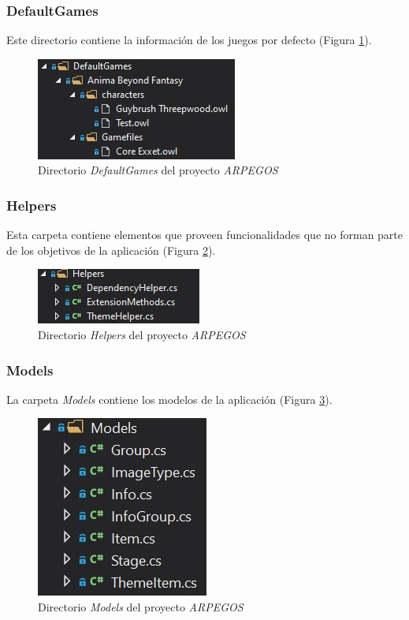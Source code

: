 {\subsubsection{DefaultGames}
Este directorio contiene la información de los juegos por defecto (Figura \ref*{DefaultGames}).

\begin{figure}[H]
    \centering
    \includegraphics[scale=1.5]{Images/ARPEGOS_DefaultGames.jpg}
    \caption{Directorio \textit{DefaultGames} del proyecto \textit{ARPEGOS}}
    \label{DefaultGames}    
\end{figure}

\subsubsection{Helpers}
Esta carpeta contiene elementos que proveen funcionalidades que no 
forman parte de los objetivos de la aplicación (Figura \ref*{Helpers}).

\begin{figure}[H]
    \centering
    \includegraphics[scale=1.5]{Images/ARPEGOS_Helpers.jpg}
    \caption{Directorio \textit{Helpers} del proyecto \textit{ARPEGOS}}
    \label{Helpers}    
\end{figure}

\subsubsection{Models}
La carpeta \textit{Models} contiene los modelos de la aplicación (Figura \ref*{Models}).

\begin{figure}[H]
    \centering
    \includegraphics[scale=1.5]{Images/ARPEGOS_Models.jpg}
    \caption{Directorio \textit{Models} del proyecto \textit{ARPEGOS}}
    \label{Models}    
\end{figure}

}
